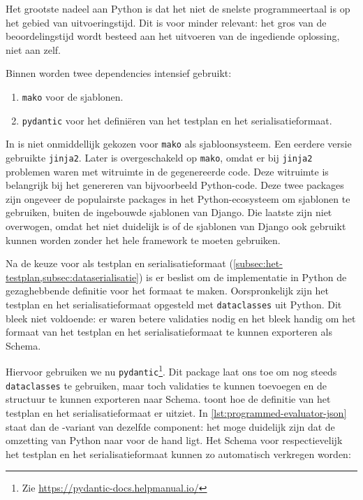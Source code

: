 Het grootste nadeel aan Python is dat het niet de snelste programmeertaal is op het gebied van uitvoeringstijd.
Dit is voor \tested{} minder relevant: het gros van de beoordelingstijd wordt besteed aan het uitvoeren van de ingediende oplossing, niet aan \tested{} zelf.

Binnen \tested{} worden twee dependencies intensief gebruikt:

\begin{enumerate}
    \item \texttt{mako} voor de sjablonen.
    \item \texttt{pydantic} voor het definiëren van het testplan en het serialisatieformaat.
\end{enumerate}

In \tested{} is niet onmiddellijk gekozen voor \texttt{mako} als sjabloonsysteem.
Een eerdere versie gebruikte \texttt{jinja2}.
Later is overgeschakeld op \texttt{mako}, omdat er bij \texttt{jinja2} problemen waren met witruimte in de gegenereerde code.
Deze witruimte is belangrijk bij het genereren van bijvoorbeeld Python-code.
Deze twee packages zijn ongeveer de populairste packages in het Python-ecosysteem om sjablonen te gebruiken, buiten de ingebouwde sjablonen van Django.
Die laatste zijn niet overwogen, omdat het niet duidelijk is of de sjablonen van Django ook gebruikt kunnen worden zonder het hele framework te moeten gebruiken.

Na de keuze voor  als testplan en serialisatieformaat (\cref{subsec:het-testplan,subsec:dataserialisatie}) is er beslist om de implementatie in Python de gezaghebbende definitie voor het formaat te maken.
Oorspronkelijk zijn het testplan en het serialisatieformaat opgesteld met \texttt{dataclasses} uit Python.
Dit bleek niet voldoende: er waren betere validaties nodig en het bleek handig om het formaat van het testplan en het serialisatieformaat te kunnen exporteren als  Schema.

Hiervoor gebruiken we nu \texttt{pydantic}\footnote{Zie \url{https://pydantic-docs.helpmanual.io/}}.
Dit package laat ons toe om nog steeds \texttt{dataclasses} te gebruiken, maar toch validaties te kunnen toevoegen en de structuur te kunnen exporteren naar  Schema.
 toont hoe de definitie van het testplan en het serialisatieformaat er uitziet.
In \cref{lst:programmed-evaluator-json} staat dan de -variant van dezelfde component: het moge duidelijk zijn dat de omzetting van Python naar  voor de hand ligt.
Het  Schema voor respectievelijk het testplan en het serialisatieformaat kunnen zo automatisch verkregen worden:

